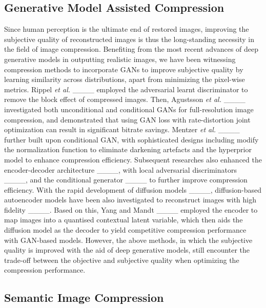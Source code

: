 \subsection{Generative Model Assisted Compression}

{Since human perception is the ultimate end of restored images, improving the subjective quality of reconstructed images is thus the long-standing necessity in the field of image compression. Benefiting from the most recent advances of deep generative models in outputting realistic images, we have been witnessing compression methods to incorporate GANs to improve subjective quality by learning similarity across distributions, apart from minimizing the pixel-wise metrics. Rippel \textit{et al.} ____ employed the adversarial learnt discriminator to remove the block effect of compressed images. Then, Agustsson \textit{et al.} ____ investigated both unconditional and conditional GANs for full-resolution image compression, and demonstrated that using GAN loss with rate-distortion joint optimization can result in significant bitrate savings. Mentzer \textit{et al.} ____ further built upon conditional GAN, with sophisticated designs including modify the normalization function to eliminate darkening artefacts and the hyperprior model to enhance compression efficiency. Subsequent researches also enhanced the encoder-decoder architecture ____, with local adversarial discriminators ____, and the conditional generator ____ to further improve compression efficiency. With the rapid development of diffusion models ____, diffusion-based autoencoder models have been also investigated to reconstruct images with high fidelity ____. Based on this, Yang and Mandt ____ employed the encoder to map images into a quantised contextual latent variable, which then aids the diffusion model as the decoder to yield competitive compression performance with GAN-based models. However, the above methods, in which the subjective quality is improved with the aid of deep generative models, still encounter the trade-off between the objective and subjective quality when optimizing the compression performance. }


\subsection{Semantic Image Compression}

